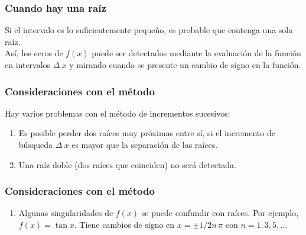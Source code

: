 \documentclass[12pt]{beamer}
\begin{document}
\begin{frame}
\frametitle{Cuando hay una raíz}
Si el intervalo es lo suficientemente pequeño, es probable que contenga una sola raíz.
\\
\bigskip
\pause
Así, los ceros de $f (x)$ puede ser detectados mediante la evaluación de la función en  intervalos $\Delta \: x$ y mirando cuando se presente un cambio de signo en la función.
\end{frame}
\begin{frame}
\frametitle{Consideraciones con el método}
Hay varios problemas con el método de incrementos sucesivos:
\begin{enumerate}[<+->]
\item Es posible perder dos raíces muy próximas entre sí, si el incremento de búsqueda $\Delta \: x$ es mayor que la separación de las raíces.
\item Una raíz doble (dos raíces que coinciden) no será detectada.
\seti
\end{enumerate}
\end{frame}
\begin{frame}
\frametitle{Consideraciones con el método}
\begin{enumerate}[<+->]
\conti
\item Algunas singularidades de $f (x)$ se puede confundir con raíces. Por ejemplo, $f (x) = \tan x$. Tiene cambios de signo en $x = \pm 1/2 n \, \pi$ con $n = 1, 3, 5,\ldots$
\end{enumerate}
\end{frame}
\end{document}
